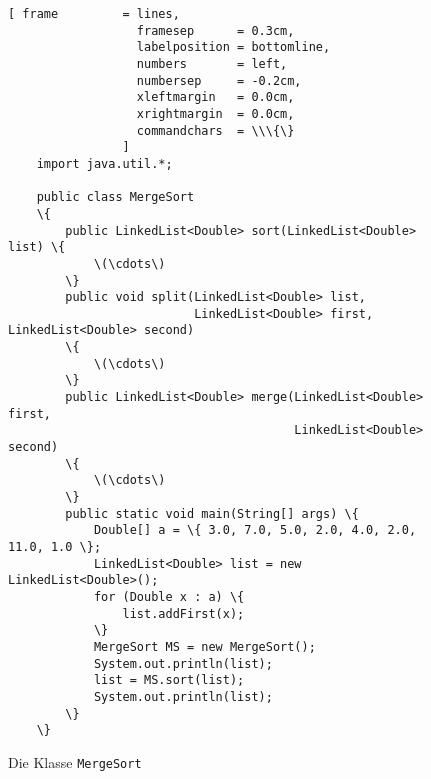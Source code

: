 \begin{figure}[!ht]
\centering
\begin{Verbatim}[ frame         = lines, 
                  framesep      = 0.3cm, 
                  labelposition = bottomline,
                  numbers       = left,
                  numbersep     = -0.2cm,
                  xleftmargin   = 0.0cm,
                  xrightmargin  = 0.0cm,
                  commandchars  = \\\{\}
                ]
    import java.util.*;
    
    public class MergeSort 
    \{  
        public LinkedList<Double> sort(LinkedList<Double> list) \{
            \(\cdots\)
        \}
        public void split(LinkedList<Double> list,
                          LinkedList<Double> first, LinkedList<Double> second) 
        \{
            \(\cdots\)
        \}
        public LinkedList<Double> merge(LinkedList<Double> first, 
                                        LinkedList<Double> second) 
        \{
            \(\cdots\)
        \}    
        public static void main(String[] args) \{
            Double[] a = \{ 3.0, 7.0, 5.0, 2.0, 4.0, 2.0, 11.0, 1.0 \};
            LinkedList<Double> list = new LinkedList<Double>();
            for (Double x : a) \{
                list.addFirst(x);
            \}
            MergeSort MS = new MergeSort();
            System.out.println(list);
            list = MS.sort(list);
            System.out.println(list);
        \}
    \}
\end{Verbatim}
\vspace*{-0.3cm}
\caption{Die Klasse \texttt{MergeSort}}
\label{fig:MergeSort}
\end{figure}


